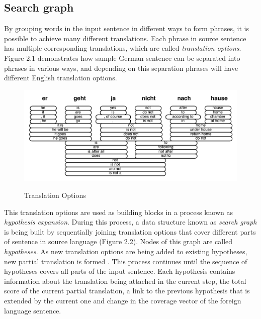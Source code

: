 \subsection{Search graph}

By grouping words in the input sentence in different ways to form phrases, it is possible to achieve many different translations. Each phrase in source sentence has multiple corresponding translations, which are called \textit{translation options}. Figure 2.1 demonstrates how sample German sentence can be separated into phrases in various ways, and depending on this separation phrases will have different English translation options. 

\begin{figure}
 \centering 
 \includegraphics{g/translation-options.pdf}
 \caption{Translation Options}
 \caption*{\textit{\cite{Koehn2009a}}}
\end{figure}

This translation options are used as building blocks in a process known as \textit{hypothesis expansion}. During this process, a data structure known as \textit{search graph} is being built by sequentially joining translation options that cover different parts of sentence in source language (Figure 2.2). Nodes of this graph are called \textit{hypotheses}. As new translation options are being added to existing hypotheses, new partial translation is formed \citep{Koehn2009a}. This process continues until the sequence of hypotheses covers all parts of the input sentence. Each hypothesis contains information about the translation being attached in the current step, the total score of the current partial translation, a link to the previous hypothesis that is extended by the current one and change in the coverage vector of the foreign language sentence.

